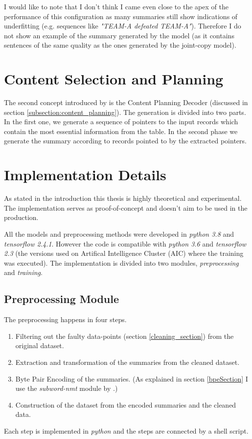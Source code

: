 I would like to note that I don't think I came even close to the apex of the performance of this configuration as many summaries still show indications of underfitting (e.g. sequences like \emph{"TEAM-A defeated TEAM-A"}). Therefore I do not show an example of the summary generated by the model (as it contains sentences of the same quality as the ones generated by the joint-copy model).

\section{Content Selection and Planning}

The second concept introduced by \citep{puduppully2019datatotext} is the Content Planning Decoder (discussed in section \ref{subsection:content_planning}). The generation is divided into two parts. In the first one, we generate a sequence of pointers to the input records which contain the most essential information from the table. In the second phase we generate the summary according to records pointed to by the extracted pointers.



\section{Implementation Details}

As stated in the introduction this thesis is highly theoretical and experimental. The implementation serves as proof-of-concept and doesn't aim to be used in the production.

All the models and preprocessing methods were developed in \emph{python 3.8} and \emph{tensorflow 2.4.1}. However the code is compatible with \emph{python 3.6} and \emph{tensorflow 2.3} (the versions used on Artifical Intelligence Cluster (AIC) where the training was executed). The implementation is divided into two modules, \emph{preprocessing} and \emph{training}.

\subsection{Preprocessing Module}

The preprocessing happens in four steps.
\begin{enumerate}
    \item Filtering out the faulty data-points (section \ref{cleaning_section}) from the original dataset.
    \item Extraction and transformation of the summaries from the cleaned dataset.
    \item Byte Pair Encoding of the summaries. (As explained in section \ref{bpeSection} I use the \emph{subword-nmt} module by \citep{sennrich2016}.)
    \item Construction of the dataset from the encoded summaries and the cleaned data. 
\end{enumerate}
Each step is implemented in \emph{python} and the steps are connected by a shell script.


